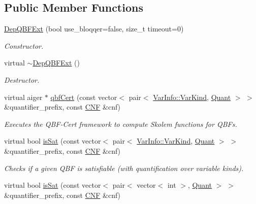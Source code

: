 \subsection*{Public Member Functions}
\begin{DoxyCompactItemize}
\item 
\hyperlink{classDepQBFExt_a21cc5bcaebcf948f6200fcaf198fa9d3}{Dep\-Q\-B\-F\-Ext} (bool use\-\_\-bloqqer=false, size\-\_\-t timeout=0)
\begin{DoxyCompactList}\small\item\em Constructor. \end{DoxyCompactList}\item 
virtual \hyperlink{classDepQBFExt_a6425c670e11fb6f2315171e27f850954}{$\sim$\-Dep\-Q\-B\-F\-Ext} ()
\begin{DoxyCompactList}\small\item\em Destructor. \end{DoxyCompactList}\item 
virtual aiger $\ast$ \hyperlink{classDepQBFExt_a9de37d00363d5ad71eaf03c011314b31}{qbf\-Cert} (const vector$<$ pair$<$ \hyperlink{classVarInfo_a64d1da76cf84fe674e5fef9764ef11cf}{Var\-Info\-::\-Var\-Kind}, \hyperlink{classQBFSolver_ac091e263cb55286cc07b2451bcf4d3c7}{Quant} $>$ $>$ \&quantifier\-\_\-prefix, const \hyperlink{classCNF}{C\-N\-F} \&cnf)
\begin{DoxyCompactList}\small\item\em Executes the Q\-B\-F-\/\-Cert framework to compute Skolem functions for Q\-B\-Fs. \end{DoxyCompactList}\item 
virtual bool \hyperlink{classExtQBFSolver_abec25b97170b79b42b85d1d4ec825a39}{is\-Sat} (const vector$<$ pair$<$ \hyperlink{classVarInfo_a64d1da76cf84fe674e5fef9764ef11cf}{Var\-Info\-::\-Var\-Kind}, \hyperlink{classQBFSolver_ac091e263cb55286cc07b2451bcf4d3c7}{Quant} $>$ $>$ \&quantifier\-\_\-prefix, const \hyperlink{classCNF}{C\-N\-F} \&cnf)
\begin{DoxyCompactList}\small\item\em Checks if a given Q\-B\-F is satisfiable (with quantification over variable kinds). \end{DoxyCompactList}\item 
virtual bool \hyperlink{classExtQBFSolver_adc1bacec3307200dd90b260789e4c808}{is\-Sat} (const vector$<$ pair$<$ vector$<$ int $>$, \hyperlink{classQBFSolver_ac091e263cb55286cc07b2451bcf4d3c7}{Quant} $>$ $>$ \&quantifier\-\_\-prefix, const \hyperlink{classCNF}{C\-N\-F} \&cnf)

\end{DoxyCompactItemize}
